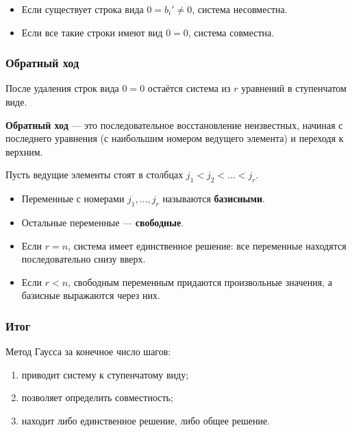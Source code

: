 \documentclass[10pt]{article}
\begin{document}
\begin{itemize}
    \item Если существует строка вида \(0 = b_i' \neq 0\), система несовместна.
    \item Если все такие строки имеют вид \(0 = 0\), система совместна.
\end{itemize}

\subsubsection*{Обратный ход}

После удаления строк вида \(0=0\) остаётся система из \(r\) уравнений в ступенчатом виде.

\begin{definition}
\textbf{Обратный ход} — это последовательное восстановление неизвестных, начиная с последнего уравнения (с наибольшим номером ведущего элемента) и переходя к верхним.
\end{definition}

Пусть ведущие элементы стоят в столбцах \(j_1 < j_2 < \dots < j_r\).

\begin{itemize}
    \item Переменные с номерами \(j_1, \dots, j_r\) называются \textbf{базисными}.
    \item Остальные переменные — \textbf{свободные}.
\end{itemize}

\begin{itemize}
    \item Если \(r = n\), система имеет единственное решение: все переменные находятся последовательно снизу вверх.
    \item Если \(r < n\), свободным переменным придаются произвольные значения, а базисные выражаются через них.
\end{itemize}

\subsubsection*{Итог}

Метод Гаусса за конечное число шагов:
\begin{enumerate}
    \item приводит систему к ступенчатому виду;
    \item позволяет определить совместность;
    \item находит либо единственное решение, либо общее решение.
\end{enumerate}
\end{document}
